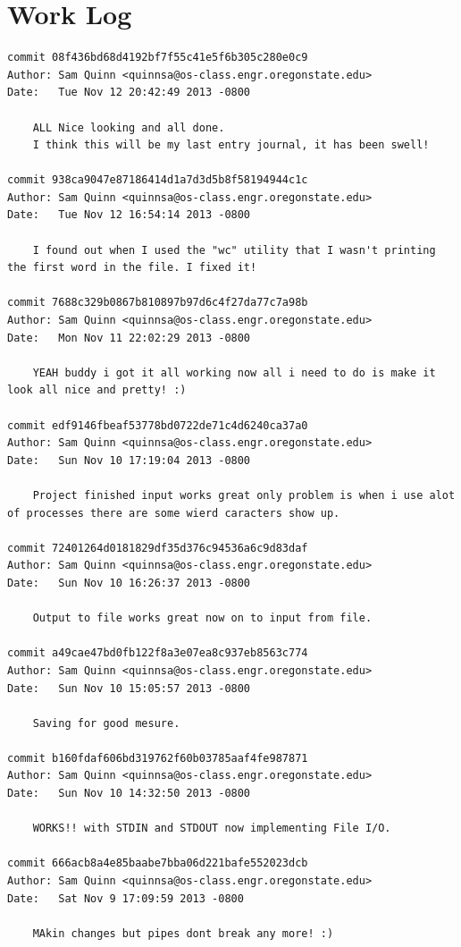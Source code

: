 \documentclass[letterpaper,10pt,notitlepage,fleqn]{article}
\begin{document}
\section*{Work Log}
\begin{verbatim}
commit 08f436bd68d4192bf7f55c41e5f6b305c280e0c9
Author: Sam Quinn <quinnsa@os-class.engr.oregonstate.edu>
Date:   Tue Nov 12 20:42:49 2013 -0800

    ALL Nice looking and all done.
    I think this will be my last entry journal, it has been swell!

commit 938ca9047e87186414d1a7d3d5b8f58194944c1c
Author: Sam Quinn <quinnsa@os-class.engr.oregonstate.edu>
Date:   Tue Nov 12 16:54:14 2013 -0800

    I found out when I used the "wc" utility that I wasn't printing the first word in the file. I fixed it!

commit 7688c329b0867b810897b97d6c4f27da77c7a98b
Author: Sam Quinn <quinnsa@os-class.engr.oregonstate.edu>
Date:   Mon Nov 11 22:02:29 2013 -0800

    YEAH buddy i got it all working now all i need to do is make it look all nice and pretty! :)

commit edf9146fbeaf53778bd0722de71c4d6240ca37a0
Author: Sam Quinn <quinnsa@os-class.engr.oregonstate.edu>
Date:   Sun Nov 10 17:19:04 2013 -0800

    Project finished input works great only problem is when i use alot of processes there are some wierd caracters show up.

commit 72401264d0181829df35d376c94536a6c9d83daf
Author: Sam Quinn <quinnsa@os-class.engr.oregonstate.edu>
Date:   Sun Nov 10 16:26:37 2013 -0800

    Output to file works great now on to input from file.

commit a49cae47bd0fb122f8a3e07ea8c937eb8563c774
Author: Sam Quinn <quinnsa@os-class.engr.oregonstate.edu>
Date:   Sun Nov 10 15:05:57 2013 -0800

    Saving for good mesure.

commit b160fdaf606bd319762f60b03785aaf4fe987871
Author: Sam Quinn <quinnsa@os-class.engr.oregonstate.edu>
Date:   Sun Nov 10 14:32:50 2013 -0800

    WORKS!! with STDIN and STDOUT now implementing File I/O.

commit 666acb8a4e85baabe7bba06d221bafe552023dcb
Author: Sam Quinn <quinnsa@os-class.engr.oregonstate.edu>
Date:   Sat Nov 9 17:09:59 2013 -0800

    MAkin changes but pipes dont break any more! :)


\end{verbatim}
\end{document}
